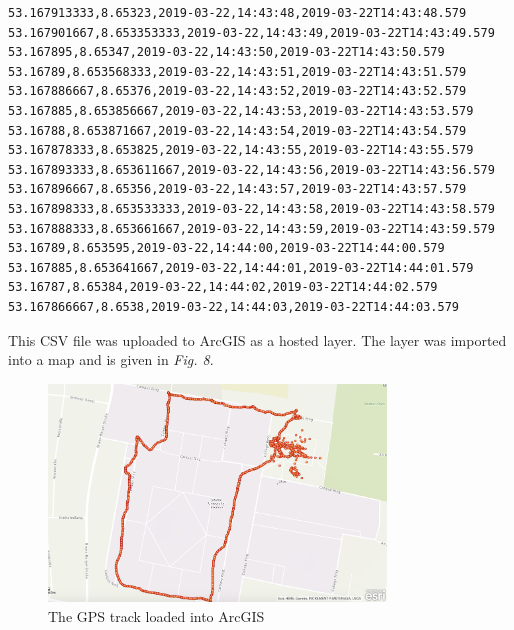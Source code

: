 \begin{verbatim}
53.167913333,8.65323,2019-03-22,14:43:48,2019-03-22T14:43:48.579
53.167901667,8.653353333,2019-03-22,14:43:49,2019-03-22T14:43:49.579
53.167895,8.65347,2019-03-22,14:43:50,2019-03-22T14:43:50.579
53.16789,8.653568333,2019-03-22,14:43:51,2019-03-22T14:43:51.579
53.167886667,8.65376,2019-03-22,14:43:52,2019-03-22T14:43:52.579
53.167885,8.653856667,2019-03-22,14:43:53,2019-03-22T14:43:53.579
53.16788,8.653871667,2019-03-22,14:43:54,2019-03-22T14:43:54.579
53.167878333,8.653825,2019-03-22,14:43:55,2019-03-22T14:43:55.579
53.167893333,8.653611667,2019-03-22,14:43:56,2019-03-22T14:43:56.579
53.167896667,8.65356,2019-03-22,14:43:57,2019-03-22T14:43:57.579
53.167898333,8.653533333,2019-03-22,14:43:58,2019-03-22T14:43:58.579
53.167888333,8.653661667,2019-03-22,14:43:59,2019-03-22T14:43:59.579
53.16789,8.653595,2019-03-22,14:44:00,2019-03-22T14:44:00.579
53.167885,8.653641667,2019-03-22,14:44:01,2019-03-22T14:44:01.579
53.16787,8.65384,2019-03-22,14:44:02,2019-03-22T14:44:02.579
53.167866667,8.6538,2019-03-22,14:44:03,2019-03-22T14:44:03.579
\end{verbatim}

This CSV file was uploaded to ArcGIS as a hosted layer. The layer was imported into a map and is given in \textit{Fig. 8}.

\vspace{1.0cm}

\begin{figure}
    \centering
        \includegraphics[width=0.8\textwidth]{images/arcgis-track.png}
        \caption{The GPS track loaded into ArcGIS}    
\end{figure}






